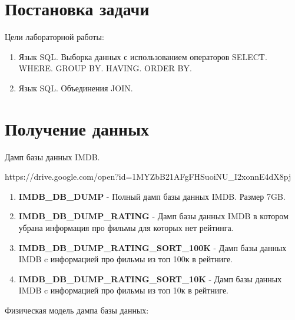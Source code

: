 \documentclass[12pt,a4paper]{article}
\begin{document}
\section{Постановка задачи}
Цели лабораторной работы:
\begin{enumerate}
    \item Язык SQL. Выборка данных с использованием операторов SELECT. WHERE. GROUP BY. HAVING. ORDER BY.
    \item Язык SQL. Объединения JOIN.
\end{enumerate}
\section{Получение данных}
Дамп базы данных IMDB. 

https://drive.google.com/open?id=1MYZbB21AFgFHSuoiNU\_I2xonnE4dX8pj
\begin{enumerate}
    \item \textbf{IMDB\_DB\_DUMP} - Полный дамп базы данных IMDB. Размер 7GB.
    \item \textbf{IMDB\_DB\_DUMP\_RATING} - Дамп базы данных IMDB в котором убрана информация про фильмы для которых нет рейтинга.
    \item \textbf{IMDB\_DB\_DUMP\_RATING\_SORT\_100K} - Дамп базы данных IMDB c информацией про фильмы из топ 100к в рейтниге.
    \item \textbf{IMDB\_DB\_DUMP\_RATING\_SORT\_10K} - Дамп базы данных IMDB c информацией про фильмы из топ 10к в рейтниге.
\end{enumerate} \par
Физическая модель дампа базы данных:
\end{document}
